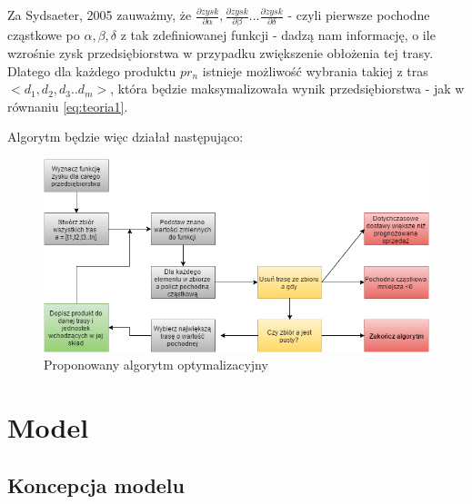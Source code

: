 \documentclass{article}
\begin{document}
Za Sydsaeter, 2005 zauważmy, że $\frac{\partial zysk}{\partial \alpha} , \frac{\partial zysk}{\partial \beta} ... \frac{\partial zysk}{\partial \delta}$ - czyli pierwsze pochodne cząstkowe po $\alpha,\beta,\delta$ z tak zdefiniowanej funkcji - dadzą nam informację, o ile wzrośnie zysk przedsiębiorstwa w przypadku zwiększenie obłożenia tej trasy. Dlatego dla każdego produktu $pr_n$ istnieje możliwość wybrania takiej z tras $<d_1,d_2,d_3..d_m>$, która będzie maksymalizowała wynik przedsiębiorstwa - jak w równaniu \ref{eq:teoria1}. 

Algorytm będzie więc działał następująco:
\\ 

\begin{figure}
  \centering
\includegraphics[width=\linewidth]{pictures/diagramoptymalizacyny.png}
  \caption{Proponowany algorytm optymalizacyjny}
  \label{fig:diagramoptymalizacyny}

\end{figure}

\newpage

\section{Model}
\subsection{Koncepcja modelu}
\end{document}
